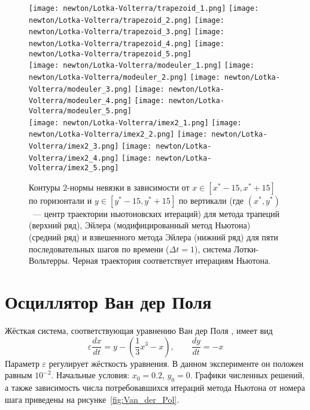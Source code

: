 \begin{figure}[ht!]
	\begin{center}
        \texttt{[image: newton/Lotka-Volterra/trapezoid\_1.png]}
        \texttt{[image: newton/Lotka-Volterra/trapezoid\_2.png]}
        \texttt{[image: newton/Lotka-Volterra/trapezoid\_3.png]}
        \texttt{[image: newton/Lotka-Volterra/trapezoid\_4.png]}
        \texttt{[image: newton/Lotka-Volterra/trapezoid\_5.png]}
        \\[4pt]
        \texttt{[image: newton/Lotka-Volterra/modeuler\_1.png]}
        \texttt{[image: newton/Lotka-Volterra/modeuler\_2.png]}
        \texttt{[image: newton/Lotka-Volterra/modeuler\_3.png]}
        \texttt{[image: newton/Lotka-Volterra/modeuler\_4.png]}
        \texttt{[image: newton/Lotka-Volterra/modeuler\_5.png]}
        \\[4pt]
        \texttt{[image: newton/Lotka-Volterra/imex2\_1.png]}
        \texttt{[image: newton/Lotka-Volterra/imex2\_2.png]}
        \texttt{[image: newton/Lotka-Volterra/imex2\_3.png]}
        \texttt{[image: newton/Lotka-Volterra/imex2\_4.png]}
        \texttt{[image: newton/Lotka-Volterra/imex2\_5.png]}
	\end{center}
    \caption{Контуры $ 2 $-нормы невязки в зависимости от $ x \in [x^* - 15, x^* + 15] $ по горизонтали
        и $ y \in [y^* - 15, y^* + 15] $ по вертикали
        (где $ (x^*, y^*) $~--- центр траектории ньютоновских итераций)
        для метода трапеций (верхний ряд), Эйлера (модифицированный метод Ньютона) (средний ряд) и взвешенного метода Эйлера (нижний ряд)
        для пяти последовательных шагов по времени
        ($ \Delta t = 1 $), система Лотки-Вольтерры.
        Черная траектория соответствует итерациям Ньютона.
	}
	\label{fig:Lotka-Volterra_residual}
\end{figure}



\section{Осциллятор Ван дер Поля}
\label{sec:Van_der_Pol}

Жёсткая система, соответствующая уравнению Ван дер Поля \cite{alexander1991modified}, имеет вид
%
\begin{equation}
    \label{eq:Van_der_Pol}
    \varepsilon \frac{d x}{d t} = y - \left( \frac{1}{3} x^3 - x \right), \qquad \frac{d y}{d t} = -x
\end{equation}
Параметр $ \varepsilon $ регулирует жёсткость уравнения.
В данном эксперименте он положен равным $ 10^{-2} $.
Начальные условия: $ x_0 = 0.2 $, $ y_0 = 0 $.
Графики численных решений, а также зависимость числа потребовавшихся итераций метода Ньютона
от номера шага приведены на рисунке~\ref{fig:Van_der_Pol}.

